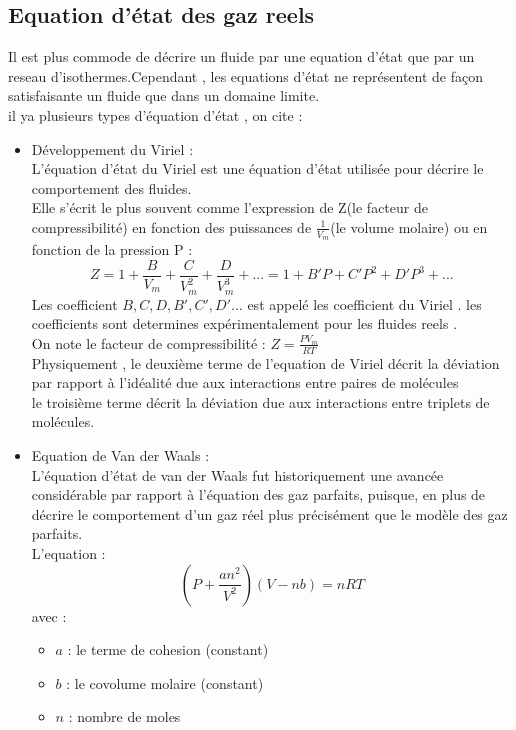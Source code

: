 \documentclass[12pt,oneside]{book}
\begin{document}
\subsection{Equation d’état des gaz reels}
Il est plus commode de décrire un fluide par une equation d’état que par un reseau d'isothermes.Cependant , les equations d’état ne représentent de façon satisfaisante un fluide que dans un domaine limite.\\
il ya plusieurs types d’équation d’état , on cite :
\begin{itemize}
    \item Développement du Viriel :\\
          L'équation d'état du Viriel est une équation d'état utilisée pour décrire le comportement des fluides.\\
          Elle s'écrit le plus souvent comme l'expression de Z(le facteur de compressibilité) en fonction des puissances de $\frac{1}{V_m}$(le volume molaire) ou en fonction de la pression P  :
          \[\boxed{ Z = 1 + \frac{B}{V_m}+\frac{C}{V_m^2}+\frac{D}{V_m^3}+...=1 + B'P + C'P^2+D'P^3+...} \]
          Les coefficient $B,C,D,B',C',D'...$ est appelé les coefficient du Viriel . les coefficients sont determines expérimentalement pour les fluides reels . \\
          On note le facteur de compressibilité : $\boxed{Z = \frac{PV_m}{RT}}$\\
          Physiquement , le deuxième terme de l'equation de Viriel décrit la déviation par rapport à l'idéalité due aux interactions entre paires de molécules\\
          le troisième terme décrit la déviation due aux interactions entre triplets de molécules.
    \item Equation de Van der Waals : \\
          L'équation d'état de van der Waals fut historiquement une avancée considérable par rapport à l'équation des gaz parfaits, puisque, en plus de décrire le comportement d'un gaz réel plus précisément que le modèle des gaz parfaits.\\
          L'equation :
          \[ \boxed{(P + \frac{an^2}{V^2})(V-nb) = nRT} \]
          avec :
          \begin{itemize}
              \item $a$ : le terme de cohesion (constant)
              \item $b$ : le covolume molaire (constant)
              \item $n$ : nombre de moles
          \end{itemize}
\end{itemize}
\end{document}
